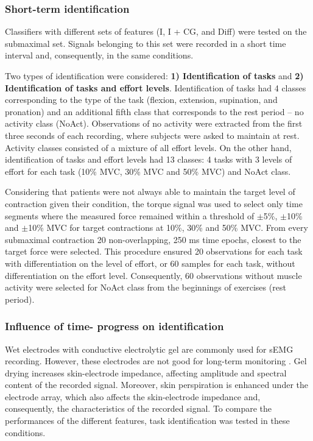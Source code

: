 \subsubsection{Short-term identification}
Classifiers with different sets of features (I, I + CG, and Diff) were tested on the submaximal set. Signals belonging to this set were recorded in a short time interval and, consequently, in the same conditions.

Two types of identification were considered: \textbf{1) Identification of tasks} and \textbf{2) Identification of tasks and effort levels}. Identification of tasks had 4 classes corresponding to the type of the task (flexion, extension, supination, and pronation) and an additional fifth class that corresponds to the rest period – no activity class (NoAct). Observations of no activity were extracted from the first three seconds of each recording, where subjects were asked to maintain at rest. Activity classes consisted of a mixture of all effort levels. On the other hand, identification of tasks and effort levels had 13 classes: 4 tasks with 3 levels of effort for each task (10\% MVC, 30\% MVC and 50\% MVC) and NoAct class.

Considering that patients were not always able to maintain the target level of contraction given their condition, the torque signal was used to select only time segments where the measured force remained within a threshold of $\pm$5\%, $\pm$10\% and $\pm$10\% MVC for target contractions at 10\%, 30\% and 50\% MVC. From every submaximal contraction 20 non-overlapping, 250 ms time epochs, closest to the target force were selected. This procedure ensured 20 observations for each task with differentiation on the level of effort, or 60 samples for each task, without differentiation on the effort level. Consequently, 60 observations without muscle activity were selected for NoAct class from the beginnings of exercises (rest period).


\subsubsection{Influence of time- progress on identification}
Wet electrodes with conductive electrolytic gel are commonly used for sEMG recording. However, these electrodes are not good for long-term monitoring \citep{Searle2000}. Gel drying increases skin-electrode impedance, affecting amplitude and spectral content of the recorded signal. Moreover, skin perspiration is enhanced under the electrode array, which also affects the skin-electrode impedance and, consequently, the characteristics of the recorded signal. To compare the performances of the different features, task identification was tested in these conditions.

